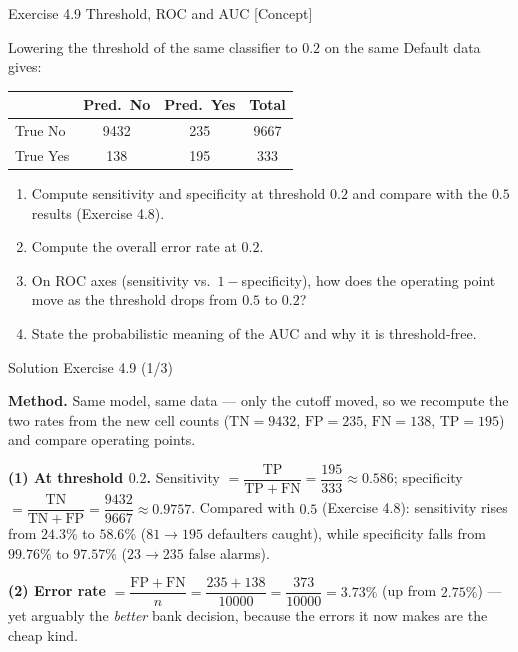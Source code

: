 \documentclass[aspectratio=169,11pt]{beamer}
\begin{document}
\begin{frame}{Exercise 4.9 \textemdash{} Threshold, ROC and AUC [Concept]}
\begin{exercise}
Lowering the threshold of the same classifier to $0.2$ on the same
Default data gives:
\begin{center}\small
\begin{tabular}{l|cc|c}
\toprule
 & Pred.\ No & Pred.\ Yes & Total \\
\midrule
True No  & 9432 & 235 & 9667 \\
True Yes & 138  & 195 & 333 \\
\bottomrule
\end{tabular}
\end{center}
\begin{enumerate}
  \item Compute sensitivity and specificity at threshold $0.2$ and
        compare with the $0.5$ results (Exercise 4.8).
  \item Compute the overall error rate at $0.2$.
  \item On ROC axes (sensitivity vs.\ $1-$specificity), how does the
        operating point move as the threshold drops from $0.5$ to $0.2$?
  \item State the probabilistic meaning of the AUC and why it is
        threshold-free.
\end{enumerate}
\end{exercise}
\end{frame}

\begin{frame}{Solution \textemdash{} Exercise 4.9 (1/3)}
\begin{solutionbox}
\textbf{Method.} Same model, same data --- only the cutoff moved, so we
recompute the two rates from the new cell counts
($\mathrm{TN}=9432$, $\mathrm{FP}=235$, $\mathrm{FN}=138$,
$\mathrm{TP}=195$) and compare operating points.

\vspace{1mm}
\textbf{(1) At threshold $0.2$.}
Sensitivity $=\dfrac{\mathrm{TP}}{\mathrm{TP+FN}}=\dfrac{195}{333}
\approx 0.586$; specificity
$=\dfrac{\mathrm{TN}}{\mathrm{TN+FP}}=\dfrac{9432}{9667}\approx 0.9757$.
Compared with $0.5$ (Exercise 4.8): sensitivity
rises from $24.3\%$ to $58.6\%$ ($81\to195$ defaulters caught), while
specificity falls from $99.76\%$ to $97.57\%$ ($23\to235$ false
alarms).

\vspace{1mm}
\textbf{(2) Error rate} $=\dfrac{\mathrm{FP+FN}}{n}
=\dfrac{235+138}{10000}=\dfrac{373}{10000}
=3.73\%$ (up from $2.75\%$) --- yet arguably the \emph{better} bank
decision, because the errors it now makes are the cheap kind.
\end{solutionbox}
\end{frame}
\end{document}
